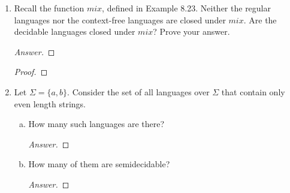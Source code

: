 \documentclass[10pt]{article}
\begin{document}
\begin{enumerate}[1)]

\item
Recall the function $mix$, defined in Example 8.23. Neither the regular languages nor the context-free languages
are closed under $mix$. Are the decidable languages closed under $mix$? Prove your answer.
\begin{proof}[Answer]
\end{proof}
\begin{proof}[Proof]
\end{proof}



\item
Let $\Sigma = \{a, b\}$. Consider the set of all languages over $\Sigma$ that contain only even length strings.
\begin{enumerate}[a)]
\item
How many such languages are there?
\begin{proof}[Answer]
\end{proof}


\item
How many of them are semidecidable?
\begin{proof}[Answer]
\end{proof}
\end{enumerate}
\end{enumerate}
\end{document}
